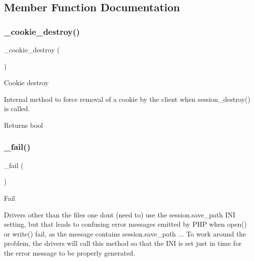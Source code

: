 \subsection{Member Function Documentation}
\mbox{\label{class_c_i___session__driver_a36771b622e8a8928c1c931ac56c12434}} 
\subsubsection{\texorpdfstring{\+\_\+cookie\+\_\+destroy()}{\_cookie\_destroy()}}
{\footnotesize\ttfamily \+\_\+cookie\+\_\+destroy (\begin{DoxyParamCaption}{ }\end{DoxyParamCaption})\hspace{0.3cm}{\ttfamily [protected]}}

Cookie destroy

Internal method to force removal of a cookie by the client when session\+\_\+destroy() is called.

\begin{DoxyReturn}{Returns}
bool 
\end{DoxyReturn}
\mbox{\label{class_c_i___session__driver_a1b1bf5bb9cba50e84f985c30f6b64773}} 
\subsubsection{\texorpdfstring{\+\_\+fail()}{\_fail()}}
{\footnotesize\ttfamily \+\_\+fail (\begin{DoxyParamCaption}{ }\end{DoxyParamCaption})\hspace{0.3cm}{\ttfamily [protected]}}

Fail

Drivers other than the \textquotesingle{}files\textquotesingle{} one don\textquotesingle{}t (need to) use the session.\+save\+\_\+path I\+NI setting, but that leads to confusing error messages emitted by P\+HP when open() or write() fail, as the message contains session.\+save\+\_\+path ... To work around the problem, the drivers will call this method so that the I\+NI is set just in time for the error message to be properly generated.

